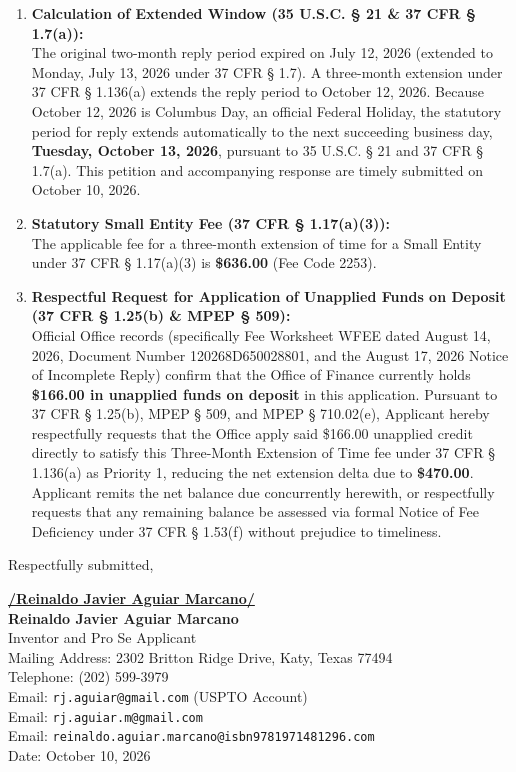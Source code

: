 \documentclass[11pt,letterpaper]{article}
\begin{document}
\begin{enumerate}[leftmargin=*]
    \item \textbf{Calculation of Extended Window (35 U.S.C. \S{} 21 \& 37 CFR \S{} 1.7(a)):} \\
    The original two-month reply period expired on July 12, 2026 (extended to Monday, July 13, 2026 under 37 CFR \S{} 1.7). A three-month extension under 37 CFR \S{} 1.136(a) extends the reply period to October 12, 2026. Because October 12, 2026 is Columbus Day, an official Federal Holiday, the statutory period for reply extends automatically to the next succeeding business day, \textbf{Tuesday, October 13, 2026}, pursuant to 35 U.S.C. \S{} 21 and 37 CFR \S{} 1.7(a). This petition and accompanying response are timely submitted on October 10, 2026.

    \item \textbf{Statutory Small Entity Fee (37 CFR \S{} 1.17(a)(3)):} \\
    The applicable fee for a three-month extension of time for a Small Entity under 37 CFR \S{} 1.17(a)(3) is \textbf{\$636.00} (Fee Code 2253).

    \item \textbf{Respectful Request for Application of Unapplied Funds on Deposit (37 CFR \S{} 1.25(b) \& MPEP \S{} 509):} \\
    Official Office records (specifically Fee Worksheet WFEE dated August 14, 2026, Document Number 120268D650028801, and the August 17, 2026 Notice of Incomplete Reply) confirm that the Office of Finance currently holds \textbf{\$166.00 in unapplied funds on deposit} in this application. Pursuant to 37 CFR \S{} 1.25(b), MPEP \S{} 509, and MPEP \S{} 710.02(e), Applicant hereby respectfully requests that the Office apply said \$166.00 unapplied credit directly to satisfy this Three-Month Extension of Time fee under 37 CFR \S{} 1.136(a) as Priority 1, reducing the net extension delta due to \textbf{\$470.00}. Applicant remits the net balance due concurrently herewith, or respectfully requests that any remaining balance be assessed via formal Notice of Fee Deficiency under 37 CFR \S{} 1.53(f) without prejudice to timeliness.
\end{enumerate}

\vspace{0.6cm}
\begin{singlespace}
\noindent Respectfully submitted, \par\vspace{0.8cm}
\underline{\textbf{/Reinaldo Javier Aguiar Marcano/}} \\
\textbf{Reinaldo Javier Aguiar Marcano} \\
Inventor and Pro Se Applicant \\
Mailing Address: 2302 Britton Ridge Drive, Katy, Texas 77494 \\
Telephone: (202) 599-3979 \\
Email: \texttt{rj.aguiar@gmail.com} (USPTO Account) \\
Email: \texttt{rj.aguiar.m@gmail.com} \\
Email: \texttt{reinaldo.aguiar.marcano@isbn9781971481296.com} \\
Date: October 10, 2026
\end{singlespace}
\end{document}
